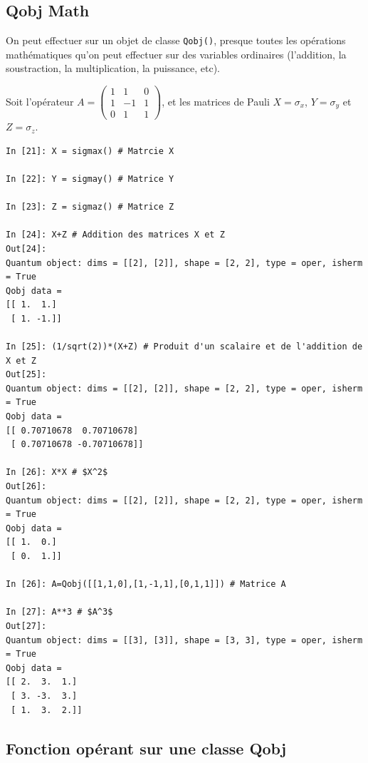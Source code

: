 \subsection{Qobj Math}

On peut effectuer sur un objet de classe \texttt{Qobj()}, presque toutes les 
opérations mathématiques qu'on peut effectuer sur des variables ordinaires 
(l'addition, la soustraction, la multiplication, la puissance, etc).\\
\begin{example}
Soit l'opérateur $A =\begin{pmatrix}1&1&0\\1&-1&1\\0&1&1\end{pmatrix}$, et les 
matrices de Pauli $X = \sigma_x$, $Y=\sigma_y$ et $Z = \sigma_z$.
\end{example}
\begin{lstlisting}[commentstyle=\scriptsize]
In [21]: X = sigmax() # Matrcie X

In [22]: Y = sigmay() # Matrice Y

In [23]: Z = sigmaz() # Matrice Z

In [24]: X+Z # Addition des matrices X et Z
Out[24]: 
Quantum object: dims = [[2], [2]], shape = [2, 2], type = oper, isherm = True
Qobj data =
[[ 1.  1.]
 [ 1. -1.]]

In [25]: (1/sqrt(2))*(X+Z) # Produit d'un scalaire et de l'addition de X et Z
Out[25]: 
Quantum object: dims = [[2], [2]], shape = [2, 2], type = oper, isherm = True
Qobj data =
[[ 0.70710678  0.70710678]
 [ 0.70710678 -0.70710678]]
 
In [26]: X*X # $X^2$
Out[26]: 
Quantum object: dims = [[2], [2]], shape = [2, 2], type = oper, isherm = True
Qobj data =
[[ 1.  0.]
 [ 0.  1.]]

In [26]: A=Qobj([[1,1,0],[1,-1,1],[0,1,1]]) # Matrice A

In [27]: A**3 # $A^3$
Out[27]: 
Quantum object: dims = [[3], [3]], shape = [3, 3], type = oper, isherm = True
Qobj data =
[[ 2.  3.  1.]
 [ 3. -3.  3.]
 [ 1.  3.  2.]]
 \end{lstlisting}

\subsection{Fonction opérant sur une classe Qobj}

